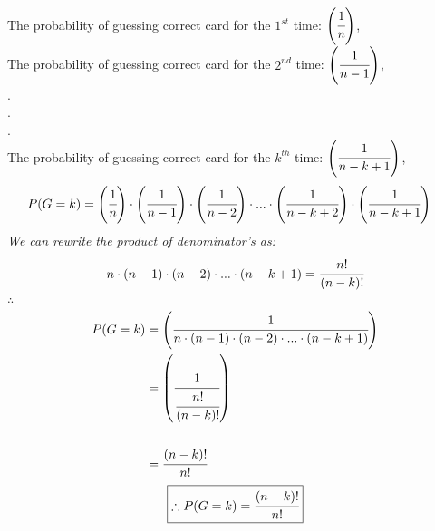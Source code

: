 \documentclass{article}
\begin{document}
\begin{enumerate}
  The probability of guessing correct card for the \(1^{st}\) time: \(\left(\cfrac{1}{n}\right)\),\\
  The probability of guessing correct card for the \(2^{nd}\) time: \(\left(\cfrac{1}{n-1}\right)\),\\
  .\\.\\.\\
  The probability of guessing correct card for the \(k^{th}\) time: \(\left(\cfrac{1}{n-k+1}\right)\),\\
  \begin{align*}
    P(G=k) &= \left(\cfrac{1}{n}\right)\cdot\left(\cfrac{1}{n-1}\right)\cdot\left(\cfrac{1}{n-2}\right)\cdot ... \cdot\left(\cfrac{1}{n-k+2}\right)\cdot\left(\cfrac{1}{n-k+1}\right)
  \end{align*}
  \textit{We can rewrite the product of denominator's as:}
  \begin{align*}
    n\cdot\left(n-1\right)\cdot\left(n-2\right)\cdot...\cdot\left(n-k+1\right) = \cfrac{n!}{(n-k)!}
  \end{align*}
  $\therefore$
  \begin{align*}
    P(G=k) &= \left(\cfrac{1}{n\cdot\left(n-1\right)\cdot\left(n-2\right)\cdot...\cdot\left(n-k+1\right)}\right)\\
    &= \left(\cfrac{1}{\cfrac{n!}{(n-k)!}}\right)\\\\
    &= \cfrac{(n-k)!}{n!}
  \end{align*}
  \[
     \boxed{\therefore P(G=k) = \cfrac{(n-k)!}{n!}}\\
    \]


\end{enumerate}
\end{document}
